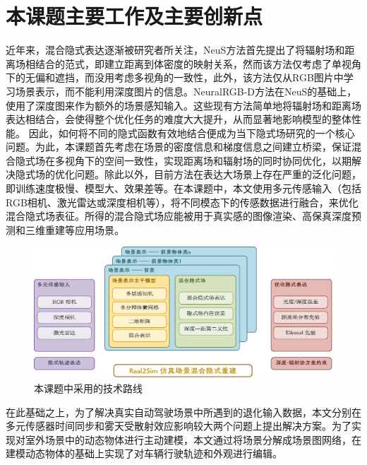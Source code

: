 \section{本课题主要工作及主要创新点}

近年来，混合隐式表达逐渐被研究者所关注，NeuS\cite{wang_neus_2021}方法首先提出了将辐射场和距离场相结合的范式，即建立距离到体密度的映射关系，然而该方法仅考虑了单视角下的无偏和遮挡，而没用考虑多视角的一致性，此外，该方法仅从RGB图片中学习场景表示，而不能利用深度图片的信息。NeuralRGB-D\cite{azinovic_neural_2022}方法在NeuS的基础上，使用了深度图来作为额外的场景感知输入。这些现有方法简单地将辐射场和距离场表达相结合，会使得整个优化任务的难度大大提升，从而显著地影响模型的整体性能。 因此，如何将不同的隐式函数有效地结合便成为当下隐式场研究的一个核心问题。为此，本课题首先考虑在场景的密度信息和梯度信息之间建立桥梁，保证混合隐式场在多视角下的空间一致性，实现距离场和辐射场的同时协同优化，以期解决隐式场的优化问题。除此以外，目前方法在表达大场景上存在严重的泛化问题，即训练速度极慢、模型大、效果差等。在本课题中，本文使用多元传感输入（包括RGB相机、激光雷达或深度相机等），将不同模态下的传感数据进行融合，来优化混合隐式场表征。所得的混合隐式场应能被用于真实感的图像渲染、高保真深度预测和三维重建等应用场景。


\begin{figure}[t]
    \centering
    \includegraphics[width=\textwidth]{undergraduate-thesis/images/method.pdf}
    \caption{本课题中采用的技术路线}
    \label{fig:method}
\end{figure}

在此基础之上，为了解决真实自动驾驶场景中所遇到的退化输入数据，本文分别在多元传感器时间同步和雾天受散射效应影响较大两个问题上提出解决方案。为了实现对室外场景中的动态物体进行主动建模，本文通过将场景分解成场景图网络，在建模动态物体的基础上实现了对车辆行驶轨迹和外观进行编辑。

